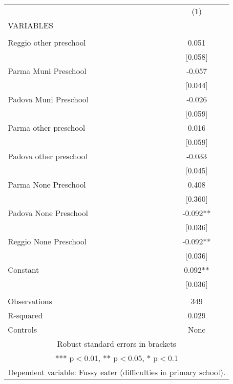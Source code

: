 \begin{tabular}{lc} \hline
 & (1) \\
VARIABLES &  \\ \hline
 &  \\
Reggio other preschool & 0.051 \\
 & [0.058] \\
Parma Muni Preschool & -0.057 \\
 & [0.044] \\
Padova Muni Preschool & -0.026 \\
 & [0.059] \\
Parma other preschool & 0.016 \\
 & [0.059] \\
Padova other preschool & -0.033 \\
 & [0.045] \\
Parma None Preschool & 0.408 \\
 & [0.360] \\
Padova None Preschool & -0.092** \\
 & [0.036] \\
Reggio None Preschool & -0.092** \\
 & [0.036] \\
Constant & 0.092** \\
 & [0.036] \\
 &  \\
Observations & 349 \\
R-squared & 0.029 \\
 Controls & None \\ \hline
\multicolumn{2}{c}{ Robust standard errors in brackets} \\
\multicolumn{2}{c}{ *** p$<$0.01, ** p$<$0.05, * p$<$0.1} \\
\multicolumn{2}{c}{ Dependent variable: Fussy eater (difficulties in primary school).} \\
\end{tabular}
